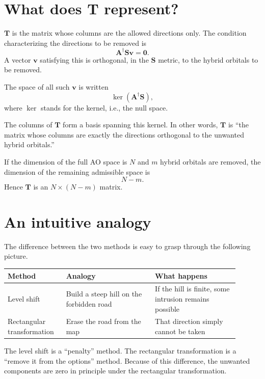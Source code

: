 \documentclass[11pt]{article}
\newcommand{\Smat}{\mathbf S}
\newcommand{\Amat}{\mathbf A}
\newcommand{\Tmat}{\mathbf T}
\begin{document}
\section{What does \(\Tmat\) represent?}

\(\Tmat\) is the matrix whose columns are the allowed directions only.
The condition characterizing the directions to be removed is
\[
  \Amat^\dagger\Smat\mathbf v=\mathbf 0 .
\]
A vector \(\mathbf v\) satisfying this is orthogonal, in the
\(\Smat\) metric, to the hybrid orbitals to be removed.

The space of all such \(\mathbf v\) is written
\[
  \ker(\Amat^\dagger\Smat) ,
\]
where \(\ker\) stands for the kernel, i.e., the null space.

The columns of \(\Tmat\) form a basis spanning this kernel. In other
words, \(\Tmat\) is ``the matrix whose columns are exactly the
directions orthogonal to the unwanted hybrid orbitals.''

If the dimension of the full AO space is \(N\) and \(m\) hybrid
orbitals are removed, the dimension of the remaining admissible space
is
\[
  N-m .
\]
Hence \(\Tmat\) is an \(N\times(N-m)\) matrix.

\section{An intuitive analogy}

The difference between the two methods is easy to grasp through the
following picture.

\begin{center}
\begin{tabular}{|p{0.22\linewidth}|p{0.35\linewidth}|p{0.33\linewidth}|}
\hline
\textbf{Method} & \textbf{Analogy} & \textbf{What happens} \\
\hline
Level shift & Build a steep hill on the forbidden road &
If the hill is finite, some intrusion remains possible \\
\hline
Rectangular transformation & Erase the road from the map &
That direction simply cannot be taken \\
\hline
\end{tabular}
\end{center}

The level shift is a ``penalty'' method. The rectangular transformation
is a ``remove it from the options'' method. Because of this difference,
the unwanted components are zero in principle under the rectangular
transformation.
\end{document}
